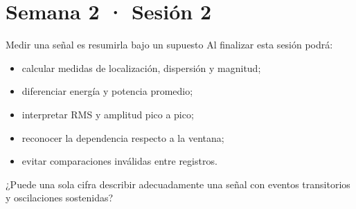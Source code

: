 \documentclass[
  ignorenonframetext,
  aspectratio=169,
  spanish,
  professionalfonts]{beamer}
\providecommand{\tightlist}{%
  \setlength{\itemsep}{0pt}\setlength{\parskip}{0pt}}
\begin{document}
\section{Semana 2 · Sesión 2}\label{semana-2-sesiuxf3n-2}

\begin{frame}{Medir una señal es resumirla bajo un supuesto}
\protect{}\label{medir-una-seuxf1al-es-resumirla-bajo-un-supuesto}
Al finalizar esta sesión podrá:

\begin{itemize}
\tightlist
\item
  calcular medidas de localización, dispersión y magnitud;
\item
  diferenciar energía y potencia promedio;
\item
  interpretar RMS y amplitud pico a pico;
\item
  reconocer la dependencia respecto a la ventana;
\item
  evitar comparaciones inválidas entre registros.
\end{itemize}

\begin{tcolorbox}[enhanced jigsaw, arc=.35mm, bottomrule=.15mm, bottomtitle=1mm, breakable, colback=white, colbacktitle=quarto-callout-note-color!10!white, colframe=quarto-callout-note-color-frame, coltitle=black, left=2mm, leftrule=.75mm, opacityback=0, opacitybacktitle=0.6, rightrule=.15mm, title={Pregunta inicial}, titlerule=0mm, toprule=.15mm, toptitle=1mm]

¿Puede una sola cifra describir adecuadamente una señal con eventos
transitorios y oscilaciones sostenidas?

\end{tcolorbox}
\end{frame}
\end{document}
